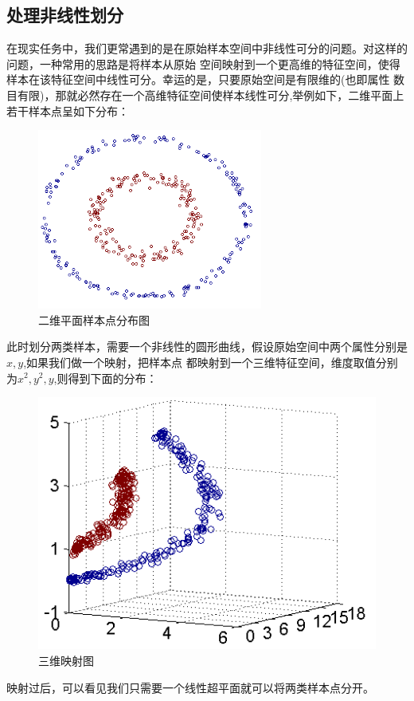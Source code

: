 \documentclass[UTF8]{ctexart}
\begin{document}
{\subsection{处理非线性划分}
在现实任务中，我们更常遇到的是在原始样本空间中非线性可分的问题。对这样的问题，一种常用的思路是将样本从原始
空间映射到一个更高维的特征空间，使得样本在该特征空间中线性可分。幸运的是，只要原始空间是有限维的(也即属性
数目有限)，那就必然存在一个高维特征空间使样本线性可分,举例如下，二维平面上若干样本点呈如下分布：\\[2ex]
\begin{figure}[ht]
    \centering
    \includegraphics[scale=1.0]{02.png}
    \caption{二维平面样本点分布图}
\end{figure}\par
此时划分两类样本，需要一个非线性的圆形曲线，假设原始空间中两个属性分别是$x,y$,如果我们做一个映射，把样本点
都映射到一个三维特征空间，维度取值分别为$x^2,y^2,y$,则得到下面的分布：\\[2ex]
\begin{figure}[ht]
    \centering
    \includegraphics[scale=0.7]{03.png}
    \caption{三维映射图}
\end{figure}\par
映射过后，可以看见我们只需要一个线性超平面就可以将两类样本点分开。
}
\end{document}
